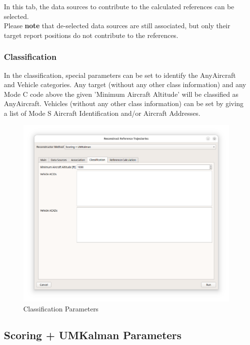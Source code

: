 In this tab, the data sources to contribute to the calculated references can be selected. \\

Please \textbf{note} that de-selected data sources are still associated, but only their target report positions do not contribute to the references.

\subsubsection{Classification}

In the classification, special parameters can be set to identify the AnyAircraft and Vehicle categories. Any target (without any other class information) and any Mode C code above the given 'Minimum Aircraft Altitude' will be classified as AnyAircraft. Vehicles (without any other class information) can be set by giving a list of Mode S Aircraft Identification and/or Aircraft Addresses. \\

\begin{figure}[H]
    \center
      \includegraphics[width=16cm]{figures/dialog_class.png}
    \caption{Classification Parameters}
\end{figure}

\subsection{Scoring + UMKalman Parameters}

